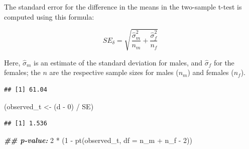 \documentclass[
  12pt,
]{krantz}
\newenvironment{Shaded}{\begin{snugshade}}{\end{snugshade}}
\newcommand{\AttributeTok}[1]{\textcolor[rgb]{0.77,0.63,0.00}{#1}}
\newcommand{\DecValTok}[1]{\textcolor[rgb]{0.00,0.00,0.81}{#1}}
\newcommand{\DocumentationTok}[1]{\textcolor[rgb]{0.56,0.35,0.01}{\textbf{\textit{#1}}}}
\newcommand{\FunctionTok}[1]{\textcolor[rgb]{0.00,0.00,0.00}{#1}}
\newcommand{\NormalTok}[1]{#1}
\newcommand{\OtherTok}[1]{\textcolor[rgb]{0.56,0.35,0.01}{#1}}
\newcommand{\SpecialCharTok}[1]{\textcolor[rgb]{0.00,0.00,0.00}{#1}}
\theoremstyle{definition}
\theoremstyle{definition}
\theoremstyle{definition}
\theoremstyle{definition}
\theoremstyle{remark}
\begin{document}
The standard error for the difference in the means in the two-sample t-test is computed using this formula:

\begin{equation}
SE_\delta 
= \sqrt{\frac{\hat\sigma_m^2}{n_m} + \frac{\hat\sigma_f^2}{n_f}}
\end{equation}

Here, \(\hat\sigma_m\) is an estimate of the standard deviation for males, and \(\hat\sigma_f\) for the females; the \(n\) are the respective sample sizes for males (\(n_m\)) and females (\(n_f\)).

\begin{Shaded}
\end{Shaded}

\begin{verbatim}
## [1] 61.04
\end{verbatim}

\begin{Shaded}
\begin{Highlighting}[]
\NormalTok{(observed\_t }\OtherTok{\textless{}{-}}\NormalTok{ (d }\SpecialCharTok{{-}} \DecValTok{0}\NormalTok{) }\SpecialCharTok{/}\NormalTok{ SE)}
\end{Highlighting}
\end{Shaded}

\begin{verbatim}
## [1] 1.536
\end{verbatim}

\begin{Shaded}
\begin{Highlighting}[]
\DocumentationTok{\#\# p{-}value:}
\DecValTok{2} \SpecialCharTok{*}\NormalTok{ (}\DecValTok{1} \SpecialCharTok{{-}} \FunctionTok{pt}\NormalTok{(observed\_t, }\AttributeTok{df =}\NormalTok{ n\_m }\SpecialCharTok{+}\NormalTok{ n\_f }\SpecialCharTok{{-}} \DecValTok{2}\NormalTok{))}
\end{Highlighting}
\end{Shaded}
\end{document}
